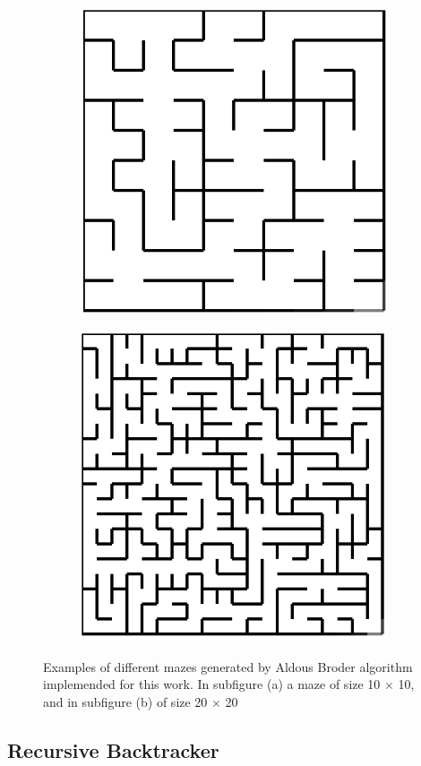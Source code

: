 \newline
\begin{figure}[!h]
	\centering
	\begin{subfigure}{.45\textwidth}
	  \centering
	  \includegraphics[width=.6\linewidth]{aldous1010}
	  \caption{}
	  \label{fig:sub1}
	\end{subfigure}
	\begin{subfigure}{.45\textwidth}
	  \centering
	  \includegraphics[width=.6\linewidth]{aldous2020}
	  \caption{}
	  \label{fig:sub2}
	\end{subfigure}
	\caption{Examples of different mazes generated by Aldous Broder algorithm implemended for this work. In subfigure (a) a maze of size 10 $\times$ 10, and in subfigure (b) of size 20 $\times$ 20}
	\label{fig:test}
	\end{figure}

\subsection{Recursive Backtracker}

